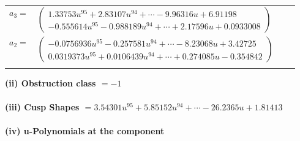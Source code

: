 \documentclass[1p]{elsarticle_modified}
\theoremstyle{definition}
\begin{document}
\begin{tabular}{m{7pt} m{180pt} m{7pt} m{180pt} }
\flushright $a_{3}=$&$\begin{pmatrix}1.33753 u^{95}+2.83107 u^{94}+\cdots-9.96316 u+6.91198\\-0.555614 u^{95}-0.988189 u^{94}+\cdots+2.17596 u+0.0933008\end{pmatrix}$ \\
\flushright $a_{2}=$&$\begin{pmatrix}-0.0756936 u^{95}-0.257581 u^{94}+\cdots-8.23068 u+3.42725\\0.0319373 u^{95}+0.0106439 u^{94}+\cdots+0.274085 u-0.354842\end{pmatrix}$\\&\end{tabular}
\flushleft \textbf{(ii) Obstruction class $= -1$}\\~\\
\flushleft \textbf{(iii) Cusp Shapes $= 3.54301 u^{95}+5.85152 u^{94}+\cdots-26.2365 u+1.81413$}\\~\\
\newpage\renewcommand{\arraystretch}{1}
\flushleft \textbf{(iv) u-Polynomials at the component}\newline \\
\end{document}
